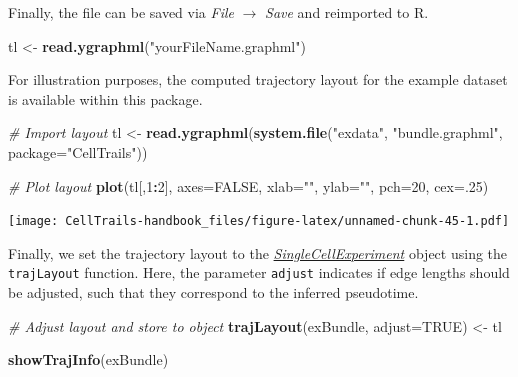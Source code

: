 \documentclass[]{book}
\newenvironment{Shaded}{\begin{snugshade}}{\end{snugshade}}
\newcommand{\KeywordTok}[1]{\textcolor[rgb]{0.13,0.29,0.53}{\textbf{#1}}}
\newcommand{\DataTypeTok}[1]{\textcolor[rgb]{0.13,0.29,0.53}{#1}}
\newcommand{\DecValTok}[1]{\textcolor[rgb]{0.00,0.00,0.81}{#1}}
\newcommand{\StringTok}[1]{\textcolor[rgb]{0.31,0.60,0.02}{#1}}
\newcommand{\CommentTok}[1]{\textcolor[rgb]{0.56,0.35,0.01}{\textit{#1}}}
\newcommand{\OtherTok}[1]{\textcolor[rgb]{0.56,0.35,0.01}{#1}}
\newcommand{\OperatorTok}[1]{\textcolor[rgb]{0.81,0.36,0.00}{\textbf{#1}}}
\newcommand{\NormalTok}[1]{#1}
\theoremstyle{definition}
\theoremstyle{definition}
\theoremstyle{definition}
\theoremstyle{remark}
\begin{document}
Finally, the file can be saved via \emph{File} \(\rightarrow\)
\emph{Save} and reimported to R.

\begin{Shaded}
\begin{Highlighting}[]
\NormalTok{tl <-}\StringTok{ }\KeywordTok{read.ygraphml}\NormalTok{(}\StringTok{"yourFileName.graphml"}\NormalTok{)}
\end{Highlighting}
\end{Shaded}

For illustration purposes, the computed trajectory layout for the
example dataset is available within this package.

\begin{Shaded}
\begin{Highlighting}[]
\CommentTok{# Import layout}
\NormalTok{tl <-}\StringTok{ }\KeywordTok{read.ygraphml}\NormalTok{(}\KeywordTok{system.file}\NormalTok{(}\StringTok{"exdata"}\NormalTok{, }\StringTok{"bundle.graphml"}\NormalTok{, }
                                \DataTypeTok{package=}\StringTok{"CellTrails"}\NormalTok{))}

\CommentTok{# Plot layout}
\KeywordTok{plot}\NormalTok{(tl[,}\DecValTok{1}\OperatorTok{:}\DecValTok{2}\NormalTok{], }\DataTypeTok{axes=}\OtherTok{FALSE}\NormalTok{, }\DataTypeTok{xlab=}\StringTok{""}\NormalTok{, }\DataTypeTok{ylab=}\StringTok{""}\NormalTok{, }\DataTypeTok{pch=}\DecValTok{20}\NormalTok{, }\DataTypeTok{cex=}\NormalTok{.}\DecValTok{25}\NormalTok{)}
\end{Highlighting}
\end{Shaded}

\texttt{[image: CellTrails-handbook\_files/figure-latex/unnamed-chunk-45-1.pdf]}

Finally, we set the trajectory layout to the
\emph{\href{http://bioconductor.org/packages/SingleCellExperiment}{SingleCellExperiment}}
object using the \texttt{trajLayout} function. Here, the parameter
\texttt{adjust} indicates if edge lengths should be adjusted, such that
they correspond to the inferred pseudotime.

\begin{Shaded}
\begin{Highlighting}[]
\CommentTok{# Adjust layout and store to object}
\KeywordTok{trajLayout}\NormalTok{(exBundle, }\DataTypeTok{adjust=}\OtherTok{TRUE}\NormalTok{) <-}\StringTok{ }\NormalTok{tl}

\KeywordTok{showTrajInfo}\NormalTok{(exBundle)}
\end{Highlighting}
\end{Shaded}
\end{document}
